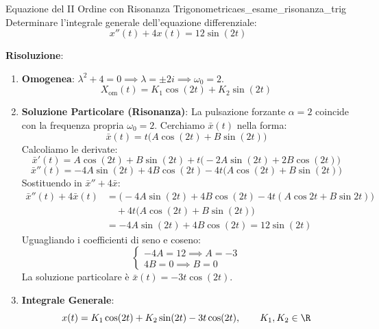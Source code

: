 \begin{esempio}{Equazione del II Ordine con Risonanza Trigonometrica}{es_esame_risonanza_trig}
Determinare l'integrale generale dell'equazione differenziale:
\[
    x''(t) + 4 x(t) = 12 \sin(2t)
\]

\textbf{Risoluzione}:
\begin{enumerate}
    \item \textbf{Omogenea}: $\lambda^2 + 4 = 0 \implies \lambda = \pm 2i \implies \omega_0 = 2$.
    \[
        X_{\text{om}}(t) = K_1 \cos(2t) + K_2 \sin(2t)
    \]
    \item \textbf{Soluzione Particolare (Risonanza)}:
    La pulsazione forzante $\alpha = 2$ coincide con la frequenza propria $\omega_0 = 2$. Cerchiamo $\bar{x}(t)$ nella forma:
    \[
        \bar{x}(t) = t \big( A \cos(2t) + B \sin(2t) \big)
    \]
    Calcoliamo le derivate:
    \[
        \bar{x}'(t) = A\cos(2t) + B\sin(2t) + t \big( -2A\sin(2t) + 2B\cos(2t) \big)
    \]
    \[
        \bar{x}''(t) = -4A\sin(2t) + 4B\cos(2t) - 4t \big( A\cos(2t) + B\sin(2t) \big)
    \]
    Sostituendo in $\bar{x}'' + 4\bar{x}$:
    \begin{align*}
        \bar{x}''(t) + 4\bar{x}(t) &= \big( -4A\sin(2t) + 4B\cos(2t) - 4t(A\cos 2t + B\sin 2t) \big) \\
        &\quad + 4t\big( A\cos(2t) + B\sin(2t) \big) \\
        &= -4A\sin(2t) + 4B\cos(2t) = 12\sin(2t)
    \end{align*}
    Uguagliando i coefficienti di seno e coseno:
    \[
        \begin{cases} -4A = 12 \implies A = -3 \\ 4B = 0 \implies B = 0 \end{cases}
    \]
    La soluzione particolare è $\bar{x}(t) = -3t \cos(2t)$.
    \item \textbf{Integrale Generale}:
    \[
        x(t) = K_1 \cos(2t) + K_2 \sin(2t) - 3t \cos(2t), \qquad K_1, K_2 \in \R
    \]
\end{enumerate}
\end{esempio}

